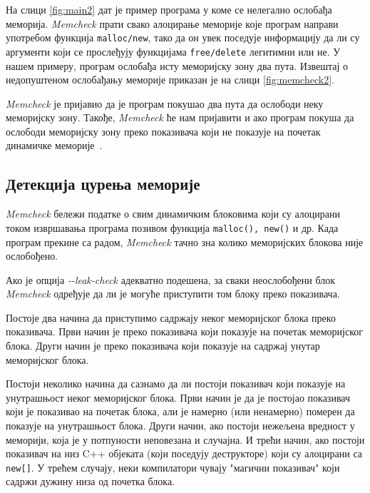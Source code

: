 \documentclass[12pt,oneside]{memoir}
\begin{document}
\indent На слици \ref{fig:main2} дат је пример програма у коме се нелегално ослобађа меморија. \textit{Memcheck} прати свако алоцирање меморије које програм направи употребом функција \texttt{malloc/new}, тако да он увек поседује информацију да ли су аргументи који се прослеђују функцијама \texttt{free/delete} легитимни или не. У нашем примеру, програм ослобађа исту меморијску зону два пута. Извештај о недопуштеном ослобађању меморије приказан је на слици \ref{fig:memcheck2}.

\indent \textit{Memcheck} је пријавио да је програм покушао два пута да ослободи неку меморијску зону.  Такође, \textit{Memcheck} ће нам пријавити и ако програм покуша да ослободи меморијску зону преко показивача који не показује на почетак динамичке меморије~\cite{memcheckRef}.

\subsection{Детекција цурења меморије}

\indent \textit{Memcheck} бележи податке о свим динамичким блоковима који су алоцирани током извршавања програма позивом функција \texttt{malloc(), new()} и др. Када програм прекине са радом, \textit{Memcheck} тачно зна колико меморијских блокова није ослобођено.

\indent Ако је опција \textit{-\--leak-check} адекватно подешена, за сваки неослобођени блок \textit{Memcheck} одређује да ли је могуће приступити том блоку преко показивача.

\indent Постоје два начина да приступимо садржају неког меморијског блока преко показивача. Први начин је преко показивача који показује на почетак меморијског блока. Други начин је преко показивача који показује на садржај унутар меморијског блока.

\indent Постоји неколико начина да сазнамо да ли постоји показивач који показује на унутрашњост неког меморијског блока. Први начин је да је постојао показивач који је показивао на почетак блока, али је намерно (или ненамерно) померен да показује на унутрашњост блока. Други начин, ако постоји нежељена вредност у меморији, која је у потпуности неповезана и случајна. И трећи начин, ако постоји показивач на низ C++ објеката (који поседују деструкторе) који су алоцирани са \texttt{new[]}. У трећем случају, неки компилатори чувају "магични показивач" који садржи дужину низа од почетка блока.
\end{document}
